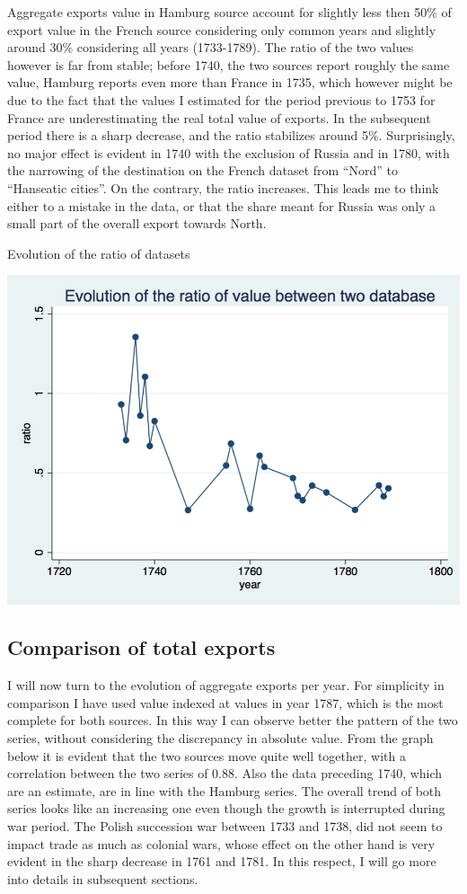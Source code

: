 \documentclass[12pt,a4paper,titlepage,english]{article}
\begin{document}
Aggregate exports value in Hamburg source account for slightly less then 50\% of export value in the French source considering only common years and slightly around 30\% considering all years (1733-1789). The ratio of the two values however is far from stable; before 1740, the two sources report roughly the same value, Hamburg reports even more than France in 1735, which however might be due to the fact that the values I estimated for the period previous to 1753 for France are underestimating the real total value of exports. In the subsequent period there is a sharp decrease, and the ratio stabilizes around 5\%. Surprisingly, no major effect is evident in 1740 with the exclusion of Russia and in 1780, with the narrowing of the destination on the French dataset from “Nord” to “Hanseatic cities”. On the contrary, the ratio increases. This leads me to think either to a mistake in the data, or that the share meant for Russia was only a small part of the overall export towards North.

\begin{center}
\caption{Evolution of the ratio of datasets}
\includegraphics[scale=.3]{long_ratio.png}
\end{center}


\subsection{Comparison of total exports}
I will now turn to the evolution of aggregate exports per year.  For simplicity in comparison I have used value indexed at values in year 1787, which is the most complete for both sources. In this way I can observe better  the pattern of the two series, without considering the discrepancy in absolute value. 
From the graph below it is evident that the two sources move quite well together, with a correlation between the two series of 0.88. Also the data preceding 1740, which are an estimate, are in line with the Hamburg series. 
The overall trend of both series looks like an increasing one even though the growth is interrupted during war period. The Polish succession war between 1733 and 1738, did not seem to impact trade as much as colonial wars, whose effect on the other hand is very evident in the sharp decrease in 1761 and 1781. In this respect, I will go more into details in subsequent sections.
\end{document}
